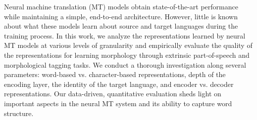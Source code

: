 Neural machine translation (MT) models obtain state-of-the-art performance while maintaining a simple, end-to-end architecture. However, little is known about what these models learn about source and target languages during the training process. In this work, we analyze the representations learned by neural MT models at various levels of granularity and empirically evaluate the quality of the representations for learning morphology through extrinsic part-of-speech and morphological tagging tasks. We conduct a thorough investigation along several parameters: word-based vs. character-based representations, depth of the encoding layer, the identity of the target language, and encoder vs. decoder representations. Our data-driven, quantitative evaluation sheds light on important aspects in the neural MT system and its ability to capture word structure.
